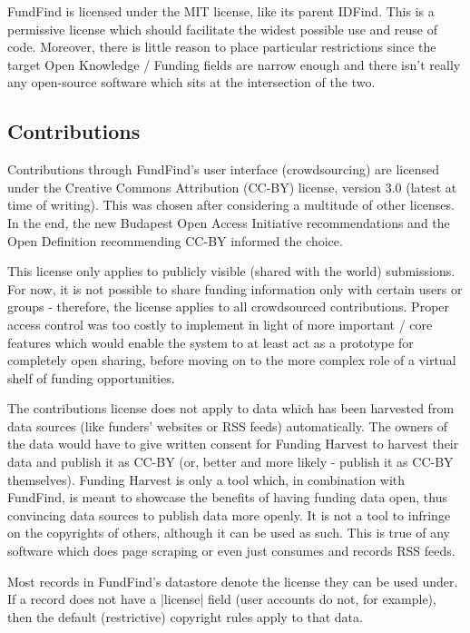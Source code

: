 FundFind is licensed under the MIT license, like its parent IDFind. This is a permissive license which should facilitate the widest possible use and reuse of code. Moreover, there is little reason to place particular restrictions since the target Open Knowledge / Funding fields are narrow enough and there isn't really any open-source software which sits at the intersection of the two.

\subsection{Contributions}

Contributions through FundFind's user interface (crowdsourcing) are licensed under the Creative Commons Attribution (CC-BY) \cite{cc-by-3} license, version 3.0 (latest at time of writing). This was chosen after considering a multitude of other licenses. In the end, the new Budapest Open Access Initiative recommendations and the Open Definition \cite{od} recommending CC-BY informed the choice.

This license only applies to publicly visible (shared with the world) submissions. For now, it is not possible to share funding information only with certain users or groups - therefore, the license applies to all crowdsourced contributions. Proper access control was too costly to implement in light of more important / core features which would enable the system to at least act as a prototype for completely open sharing, before moving on to the more complex role of a virtual shelf of funding opportunities.

The contributions license does not apply to data which has been harvested from data sources (like funders' websites or RSS feeds) automatically. The owners of the data would have to give written consent for Funding Harvest to harvest their data and publish it as CC-BY (or, better and more likely - publish it as CC-BY themselves). Funding Harvest is only a tool which, in combination with FundFind, is meant to showcase the benefits of having funding data open, thus convincing data sources to publish data more openly. It is not a tool to infringe on the copyrights of others, although it can be used as such. This is true of any software which does page scraping or even just consumes and records RSS feeds.

Most records in FundFind's datastore denote the license they can be used under. If a record does not have a |license| field (user accounts do not, for example), then the default (restrictive) copyright rules apply to that data.